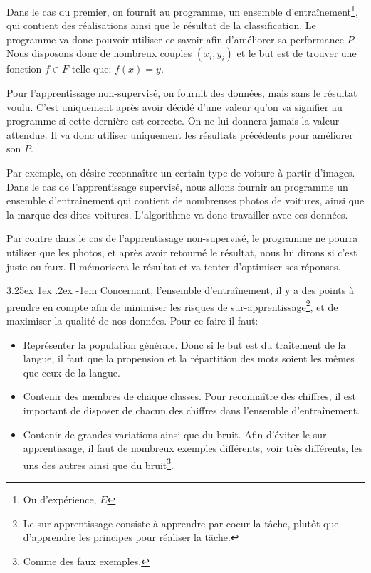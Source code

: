 \documentclass[a4paper, 11pt]{article}
\makeatletter
\renewcommand\paragraph{\@startsection{paragraph}{5}{\z@}%
  {3.25ex \@plus1ex \@minus.2ex}%
  {-1em}%
  {\normalfont\normalsize\bfseries}}
\makeatother
\begin{document}
Dans le cas du premier, on fournit au programme, un ensemble d'entraînement\footnote{Ou d'expérience, $E$}, qui contient des réalisations ainsi que le résultat de la classification. Le programme va donc pouvoir utiliser ce savoir afin d'améliorer sa performance $P$.
Nous disposons donc de nombreux couples $(x_i, y_i)$ et le but est de trouver une fonction $f \in F$ telle que: $f(x) = y$.

Pour l'apprentissage non-supervisé, on fournit des données, mais sans le résultat voulu. C'est uniquement après avoir décidé d'une valeur qu'on va signifier au programme si cette dernière est correcte. On ne lui donnera jamais la valeur attendue. Il va donc utiliser uniquement les résultats précédents pour améliorer son $P$.

Par exemple, on désire reconnaître un certain type de voiture à partir d'images. Dans le cas de l'apprentissage supervisé, nous allons fournir au programme un ensemble d'entraînement qui contient de nombreuses photos de voitures, ainsi que la marque des dites voitures. L'algorithme va donc travailler avec ces données.

Par contre dans le cas de l'apprentissage non-supervisé, le programme ne pourra utiliser que les photos, et après avoir retourné le résultat, nous lui dirons si c'est juste ou faux. Il mémorisera le résultat et va tenter d'optimiser ses réponses.

\paragraph{}
Concernant, l'ensemble d'entraînement, il y a des points à prendre en compte afin de minimiser les risques de sur-apprentissage\footnote{Le sur-apprentissage consiste à apprendre par coeur la tâche, plutôt que d'apprendre les principes pour réaliser la tâche.}, et de maximiser la qualité de nos données.
Pour ce faire il faut:\label{astuce ensemble d'entraînement}
\begin{itemize}
\item Représenter la population générale. Donc si le but est du traitement de la langue, il faut que la propension et la répartition des mots soient les mêmes que ceux de la langue.
\item Contenir des membres de chaque classes. Pour reconnaître des chiffres, il est important de disposer de chacun des chiffres dans l'ensemble d'entraînement.
\item Contenir de grandes variations ainsi que du bruit. Afin d'éviter le sur-apprentissage, il faut de nombreux exemples différents, voir très différents, les uns des autres ainsi que du bruit\footnote{Comme des faux exemples.}.
\end{itemize}
\end{document}
